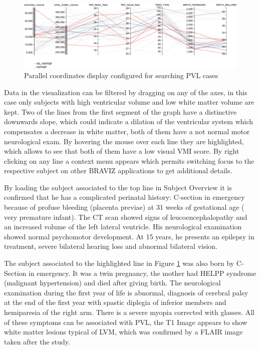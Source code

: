 \documentclass[twocolumn]{svjour3}
\begin{document}
\begin{figure}
\begin{center}
\includegraphics[width=\linewidth]{figures/cases/parallel_coordinates}
\end{center}
 \caption{\label{fig_parallel}Parallel coordinates display configured for searching PVL cases}
\end{figure}

Data in the visualization can be filtered by dragging on any of the axes, in this case only subjects with high ventricular volume and low white matter volume are kept. Two of the lines from the first segment of the graph have a distinctive downwards slope, which could indicate a dilation of the ventricular system which compensates a decrease in white matter, both of them have a not normal motor neurological exam. By hovering the mouse over each line they are highlighted, which allows to see that both of them have a low visual VMI score. By right clicking on any line a context menu appears which permits switching focus to the respective subject on other BRAVIZ applications to get additional details. 

By loading the subject associated to the top line in Subject Overview it is confirmed that he has a complicated perinatal history: C-section in emergency because of profuse bleeding (placenta previae) at 31 weeks of gestational age ( very premature infant). The  CT scan showed signs of leucoencephalopathy  and an  increased volume of the left lateral ventricle. His neurological examination showed normal psychomotor development. At 15 years, he presents an epilepsy in  treatment, severe bilateral hearing loss and abnormal bilateral vision.  

The subject associated to the highlighted line in Figure \ref{fig_parallel} was also born by C-Section in emergency. It was a twin pregnancy, the mother had HELPP syndrome (malignant hypertension) and died after giving birth. The neurological examination during the first year of life is abnormal, diagnosis of cerebral palsy at the end of the first year with spastic diplegia of inferior members and hemiparesia of the right arm.  There is a severe myopia corrected with glasses. All of these symptoms can be associated with PVL, the T1 Image appears to show white matter lesions typical of LVM, which was confirmed by a FLAIR image taken after the study.
\end{document}
